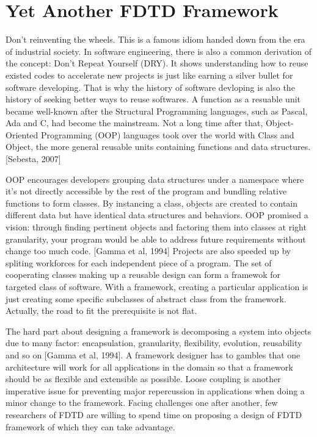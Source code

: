 \section{Yet Another FDTD Framework}

Don't reinventing the wheels. This is a famous idiom handed down from the era of industrial society. In software
engineering, there is also a common derivation of the concept: Don't Repeat Yourself (DRY). It shows understanding how
to reuse existed codes to accelerate new projects is just like earning a silver bullet for software developing. That is
why the history of software devloping is also the history of seeking better ways to reuse softwares. A function as a
resuable unit became well-known after the Structural Programming languages, such as Pascal, Ada and C, had become the
mainstream. Not a long time after that, Object-Oriented Programming (OOP) languages took over the world with Class and
Object, the more general reusable units containing functions and data structures. [Sebesta, 2007]

OOP encourages developers grouping data structures under a namespace where it's not directly accessible by the rest of
the program and bundling relative functions to form classes. By instancing a class, objects are created to contain
different data but have identical data structures and behaviors. OOP promised a vision: through finding pertinent
objects and factoring them into classes at right granularity, your program would be able to address future requirements
without change too much code. [Gamma et al, 1994] Projects are also speeded up by spliting workforces for each
independent piece of a program. The set of cooperating classes making up a reusable design can form a framewok for
targeted class of software. With a framework, creating a particular application is just creating some specific
subclasses of abstract class from the framework. Actually, the road to fit the prerequisite is not flat.

The hard part about designing a framework is decomposing a system into objects due to many factor: encapsulation,
granularity, flexibility, evolution, reusability and so on [Gamma et al, 1994]. A framework designer has to gambles that
one architecture will work for all applications in the domain so that a framework should be as flexible and extensible
as possible. Loose coupling is another imperative issue for preventing major repercussion in applications when doing a
minor change to the framework. Facing challenges one after another, few researchers of FDTD are willing to spend time on
proposing a design of FDTD framework of which they can take advantage.


